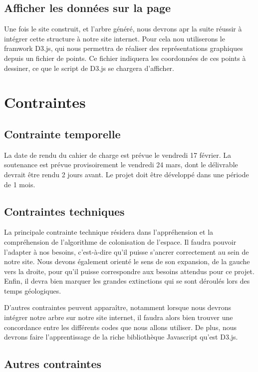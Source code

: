 \documentclass[a4paper]{article}
\begin{document}
{	\subsection{Afficher les données sur la page}
		Une fois le site construit, et l'arbre généré, nous devrons apr la suite réussir à intégrer cette structure à notre site internet. Pour cela nou utiliserons le framwork D3.js, qui nous permettra de réaliser des représentations graphiques depuis un fichier de points. Ce fichier indiquera les coordonnées de ces points à dessiner, ce que le script de D3.js se chargera d'afficher.
		

\section{Contraintes}

	\subsection{Contrainte temporelle}
		La date de rendu du cahier de charge est prévue le vendredi 17 février.
		La soutenance est prévue provisoirement le vendredi 24 mars, dont le délivrable devrait être rendu 2 jours avant.
		Le projet doit être développé dans une période de 1 mois.

	\subsection{Contraintes techniques}
		La principale contrainte technique résidera dans l'appréhension et la compréhension de l'algorithme de colonisation de l'espace. Il faudra pouvoir l'adapter à nos besoins, c'est-à-dire qu'il puisse s'ancrer correctement au sein de notre site. Nous devons également orienté le sens de son expansion, de la gauche vers la droite, pour qu'il puisse correspondre aux besoins attendus pour ce projet. Enfin, il devra bien marquer les grandes extinctions qui se sont déroulés lors des temps géologiques.

		D'autres contraintes peuvent apparaître, notamment lorsque nous devrons intégrer notre arbre sur notre site internet, il faudra alors bien trouver une concordance entre les différents codes que nous allons utiliser. De plus, nous devrons faire l'apprentissage de la riche bibliothèque Javascript qu'est D3.js.
		

	\subsection{Autres contraintes}

}
\end{document}
